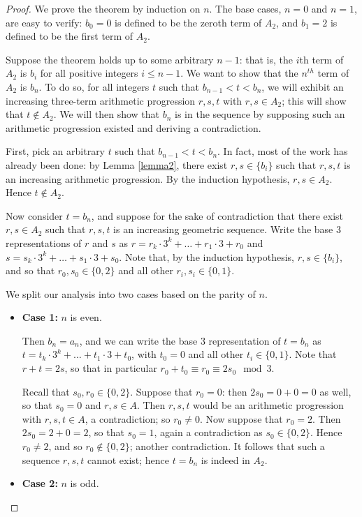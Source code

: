 \documentclass[11pt,letterpaper,twoside,english]{article}
\theoremstyle{theorem}
\theoremstyle{remark}
\begin{document}
\begin{proof}
We prove the theorem by induction on $n$. The base cases, $n=0$ and $n=1$, are easy to verify: $b_0=0$ is defined to be the zeroth term of $A_2$, and $b_1=2$ is defined to be the first term of $A_2$.

Suppose the theorem holds up to some arbitrary $n-1$: that is, the $i$th term of $A_2$ is $b_i$ for all positive integers $i\leq n-1$. We want to show that the $n^{th}$ term of $A_2$ is $b_n$. To do so, for all integers $t$ such that $b_{n-1}<t<b_n$, we will exhibit an increasing three-term arithmetic progression $r, s, t$ with $r,s\in A_2$; this will show that $t\not\in A_2$. We will then show that $b_n$ is in the sequence by supposing such an arithmetic progression existed and deriving a contradiction.

First, pick an arbitrary $t$ such that $b_{n-1}<t<b_n$. In fact, most of the work has already been done: by Lemma \ref{lemma2}, there exist $r, s\in \{b_i\}$ such that $r, s, t$ is an increasing arithmetic progression. By the induction hypothesis, $r,s\in A_2$. Hence $t\not\in A_2$.

Now consider $t=b_n$, and suppose for the sake of contradiction that there exist $r,s\in A_2$ such that $r, s,t$ is an increasing geometric sequence. Write the base 3 representations of $r$ and $s$ as $r=r_k\cdot 3^k+\ldots + r_1\cdot 3 + r_0$ and $s=s_k\cdot 3^k+\ldots + s_1\cdot 3 + s_0$. Note that, by the induction hypothesis, $r,s\in \{b_i\}$, and so that $r_0, s_0\in \{0, 2\}$ and all other $r_i, s_i\in \{0, 1\}$. 

We split our analysis into two cases based on the parity of $n$.

\begin{itemize}
\item{\bf Case 1:} $n$ is even.

Then $b_n=a_n$, and we can write the base 3 representation of $t=b_n$ as $t=t_k\cdot 3^k+\ldots + t_1\cdot 3 + t_0$, with $t_0=0$ and all other $t_i\in \{0,1\}$. Note that $r+t=2s$, so that in particular $r_0+t_0\equiv r_0\equiv 2s_0\mod 3$.

Recall that $s_0, r_0\in \{0, 2\}$. Suppose that $r_0=0$: then $2s_0=0+0=0$ as well, so that $s_0=0$ and $r, s\in A$. Then $r,s,t$ would be an arithmetic progression with $r,s,t\in A$, a contradiction; so $r_0\neq 0$. Now suppose that $r_0=2$. Then $2s_0=2+0=2$, so that $s_0=1$, again a contradiction as $s_0\in \{0, 2\}$. Hence $r_0\neq 2$, and so $r_0\not\in \{0, 2\}$; another contradiction. It follows that such a sequence $r,s,t$ cannot exist; hence $t=b_n$ is indeed in $A_2$.
\item {\bf Case 2:} $n$ is odd.


\end{itemize}
\end{proof}
\end{document}
